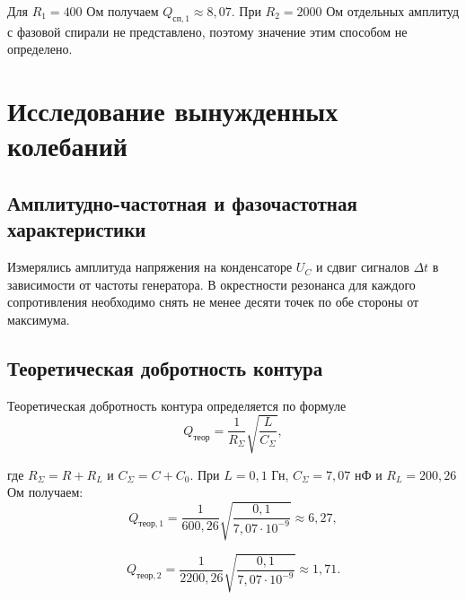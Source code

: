 \documentclass[a4paper,14pt]{extarticle}
\begin{document}
Для $R_1=400$ Ом получаем
$Q_{\text{сп},1}\approx8{,}07$.
При $R_2=2000$ Ом отдельных амплитуд с фазовой спирали
не представлено, поэтому значение этим способом не определено.

\section{Исследование вынужденных колебаний}

\subsection{Амплитудно-частотная и фазочастотная характеристики}
Измерялись амплитуда напряжения на конденсаторе $U_C$
и сдвиг сигналов $\Delta t$ в зависимости от частоты генератора.
В окрестности резонанса для каждого сопротивления необходимо
снять не менее десяти точек по обе стороны от максимума.

\subsection{Теоретическая добротность контура}
Теоретическая добротность контура определяется
по формуле
\[
    Q_{\text{теор}} =
    \frac{1}{R_\Sigma}\sqrt{\frac{L}{C_\Sigma}},
\]

где $R_\Sigma = R + R_L$ и $C_\Sigma = C + C_0$.
При $L = 0{,}1$ Гн, $C_\Sigma = 7{,}07$ нФ
и $R_L = 200{,}26$ Ом получаем:
\[
    Q_{\text{теор},1} =
    \frac{1}{600{,}26}
    \sqrt{\frac{0{,}1}{7{,}07\cdot10^{-9}}}
    \approx 6{,}27,
\]

\[
    Q_{\text{теор},2} =
    \frac{1}{2200{,}26}
    \sqrt{\frac{0{,}1}{7{,}07\cdot10^{-9}}}
    \approx 1{,}71.
\]

\newpage
\end{document}
